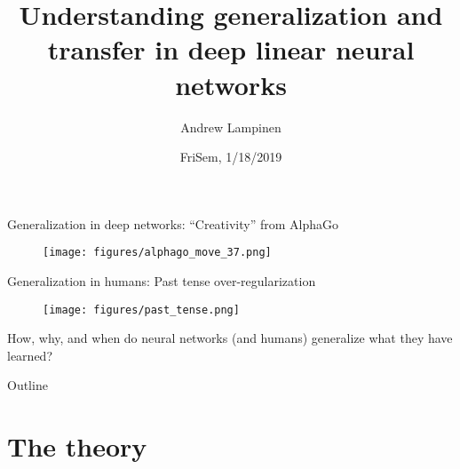 \documentclass{beamer}
\begin{document}
\title{Understanding generalization and transfer in deep linear neural networks}
\author{Andrew Lampinen}
\date{FriSem, 1/18/2019}
\frame{\titlepage}

\begin{frame}{Generalization in deep networks: ``Creativity'' from AlphaGo}
\begin{figure}
\texttt{[image: figures/alphago\_move\_37.png]}
\end{figure}
\end{frame}

\begin{frame}{Generalization in humans: Past tense over-regularization}
\begin{figure}
\texttt{[image: figures/past\_tense.png]}
\end{figure}
\end{frame}

\begin{frame}[standout]
How, why, and when do neural networks (and humans) generalize what they have learned?
\end{frame}

\begin{frame}{Outline}
\vspace{1em}
\tableofcontents
\end{frame}

\section{The theory}
\end{document}
